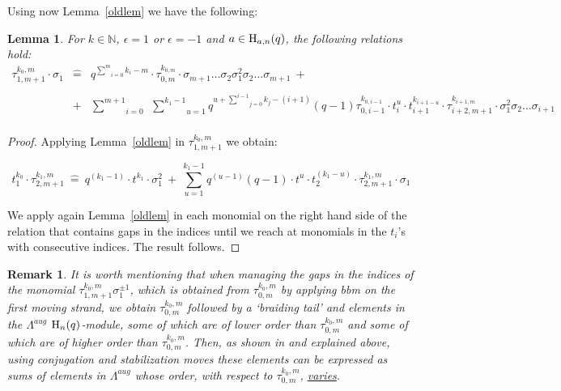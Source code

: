 \documentclass[11pt]{amsart}
\newtheorem{lemma}{Lemma}
\newtheorem{remark}{Remark}
\begin{document}
Using now Lemma~\ref{oldlem} we have the following:

\begin{lemma}\label{newgaps}
For $k\in \mathbb{N}$, $\epsilon =1$ or $\epsilon =-1$ and $a\in {\rm H}_{a, n}(q)$, the following relations hold:
\[
\begin{array}{lll}
\tau_{1, m+1}^{k_0, m}\cdot \sigma_1 & \widehat{=} & q^{\underset{i=0}{\overset{m}{\sum}}k_i-m}\cdot \tau_{0, m}^{k_{0, m}}\cdot \sigma_{m+1} \ldots \sigma_2 \sigma_1^2 \sigma_2 \ldots \sigma_{m+1}\ +\\
&&\\
 & + & \underset{i=0}{\overset{m+1}{\sum}}\ \  \underset{u=1}{\overset{k_1-1}{\sum}} q^{u+ \underset{j=0}{\overset{i-1}{\sum}}k_j -(i+1)} (q-1) \tau_{0, i-1}^{k_{0, i-1}}\cdot t_i^u \cdot t_{i+1}^{k_{i+1-u}}\cdot \tau_{i+2, m+1}^{k_{i+1, m}}\cdot \sigma_1^2\sigma_2\ldots \sigma_{i+1}\\
\end{array}
\]
\end{lemma}

\begin{proof}
Applying Lemma~\ref{oldlem} in $\tau_{1, m+1}^{k_0, m}$ we obtain:

$$t_1^{k_0}\cdot \tau_{2, m+1}^{k_1, m}\ \widehat{=}\ q^{(k_1-1)}\cdot t^{k_1}\cdot \sigma_1^{2}\ +\ \underset{u=1}{\overset{k_1-1}{\sum}} q^{(u-1)} (q-1)\cdot t^{u}\cdot t_2^{(k_1-u)}\cdot \tau_{2, m+1}^{k_1, m}\cdot \sigma_1$$

\noindent We apply again Lemma~\ref{oldlem} in each monomial on the right hand side of the relation that contains gaps in the indices until we reach at monomials in the $t_i$'s with consecutive indices. The result follows.
\end{proof}

\begin{remark}\label{rmk4}\rm
It is worth mentioning that when managing the gaps in the indices of the monomial $\tau_{1, m+1}^{k_0, m}\sigma_1^{\pm 1}$, which is obtained from $\tau_{0, m}^{k_0, m}$ by applying bbm on the first moving strand, we obtain $\tau_{0, m}^{k_0, m}$ followed by a `braiding tail' and elements in the $\Lambda^{aug}$ ${\rm H}_n(q)$-module, some of which are of lower order than $\tau_{0, m}^{k_0, m}$ and some of which are of higher order than $\tau_{0, m}^{k_0, m}$. Then, as shown in \cite{DL2} and explained above, using conjugation and stabilization moves these elements can be expressed as sums of elements in $\Lambda^{aug}$ whose order, with respect to $\tau_{0, m}^{k_0, m}$, \underline{varies}.
\end{remark}
\end{document}
